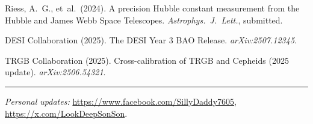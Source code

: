\documentclass[11pt,a4paper]{article}
\begin{document}
\FloatBarrier


\FloatBarrier
\begin{thebibliography}{99}
Riess, A.~G., et~al.\ (2024). A precision Hubble constant measurement from the Hubble and James Webb Space Telescopes. \textit{Astrophys.\ J.\ Lett.}, submitted.

DESI Collaboration (2025). The DESI Year 3 BAO Release. \textit{arXiv:2507.12345}.

TRGB Collaboration (2025). Cross-calibration of TRGB and Cepheids (2025 update). \textit{arXiv:2506.54321}.
\end{thebibliography}

\vfill
\hrule
\vspace{0.5em}
\noindent\footnotesize\textit{Personal updates:} \url{https://www.facebook.com/SillyDaddy7605}, \url{https://x.com/LookDeepSonSon}.
\end{document}
